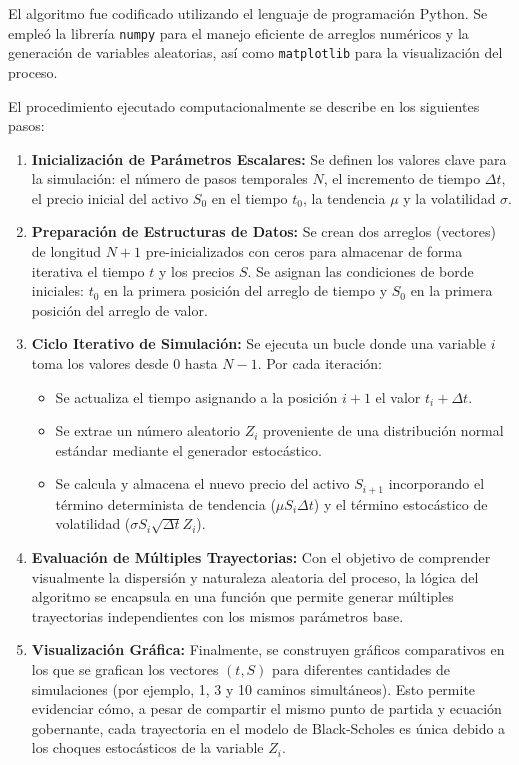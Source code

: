 \documentclass[12pt, a4paper]{article}
\begin{document}
El algoritmo fue codificado utilizando el lenguaje de programación Python. Se empleó la librería \texttt{numpy} para el manejo eficiente de arreglos numéricos y la generación de variables aleatorias, así como \texttt{matplotlib} para la visualización del proceso.

El procedimiento ejecutado computacionalmente se describe en los siguientes pasos:

\begin{enumerate}
    \item \textbf{Inicialización de Parámetros Escalares:} Se definen los valores clave para la simulación: el número de pasos temporales $N$, el incremento de tiempo $\Delta t$, el precio inicial del activo $S_0$ en el tiempo $t_0$, la tendencia $\mu$ y la volatilidad $\sigma$.
    
    \item \textbf{Preparación de Estructuras de Datos:} Se crean dos arreglos (vectores) de longitud $N+1$ pre-inicializados con ceros para almacenar de forma iterativa el tiempo $t$ y los precios $S$. Se asignan las condiciones de borde iniciales: $t_0$ en la primera posición del arreglo de tiempo y $S_0$ en la primera posición del arreglo de valor.
    
    \item \textbf{Ciclo Iterativo de Simulación:} Se ejecuta un bucle donde una variable $i$ toma los valores desde $0$ hasta $N-1$. Por cada iteración:
    \begin{itemize}
        \item Se actualiza el tiempo asignando a la posición $i+1$ el valor $t_i + \Delta t$.
        \item Se extrae un número aleatorio $Z_i$ proveniente de una distribución normal estándar mediante el generador estocástico.
        \item Se calcula y almacena el nuevo precio del activo $S_{i+1}$ incorporando el término determinista de tendencia ($\mu S_i \Delta t$) y el término estocástico de volatilidad ($\sigma S_i \sqrt{\Delta t} Z_i$).
    \end{itemize}
    
    \item \textbf{Evaluación de Múltiples Trayectorias:} Con el objetivo de comprender visualmente la dispersión y naturaleza aleatoria del proceso, la lógica del algoritmo se encapsula en una función que permite generar múltiples trayectorias independientes con los mismos parámetros base.
    
    \item \textbf{Visualización Gráfica:} Finalmente, se construyen gráficos comparativos en los que se grafican los vectores $(t, S)$ para diferentes cantidades de simulaciones (por ejemplo, 1, 3 y 10 caminos simultáneos). Esto permite evidenciar cómo, a pesar de compartir el mismo punto de partida y ecuación gobernante, cada trayectoria en el modelo de Black-Scholes es única debido a los choques estocásticos de la variable $Z_i$.
\end{enumerate}
\end{document}
